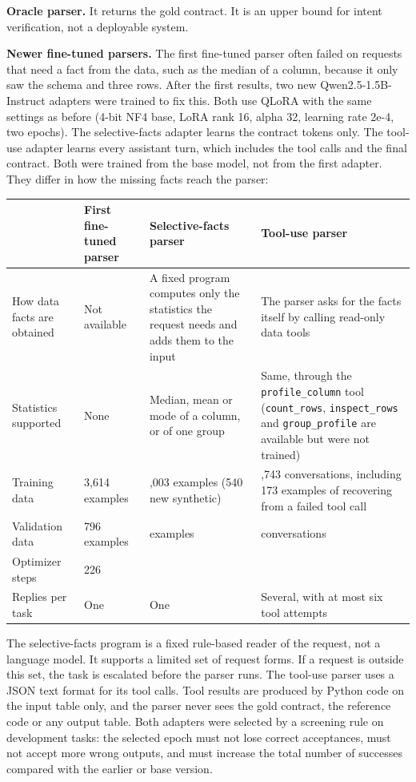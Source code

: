 \documentclass[11pt]{article}
\begin{document}
\textbf{Oracle parser.} It returns the gold contract. It is an upper
bound for intent verification, not a deployable system.

\textbf{Newer fine-tuned parsers.} The first fine-tuned parser often
failed on requests that need a fact from the data, such as the median of
a column, because it only saw the schema and three rows. After the first
results, two new Qwen2.5-1.5B-Instruct adapters were trained to fix
this. Both use QLoRA with the same settings as before (4-bit NF4 base,
LoRA rank 16, alpha 32, learning rate 2e-4, two epochs). The
selective-facts adapter learns the contract tokens only. The tool-use
adapter learns every assistant turn, which includes the tool calls and
the final contract. Both were trained from the base model, not from the
first adapter. They differ in how the missing facts reach the parser:

\begin{table}[!tp]
\centering\footnotesize\setlength{\tabcolsep}{3pt}\renewcommand{\arraystretch}{1.1}
\begin{tabularx}{\textwidth}{ll>{\raggedright\arraybackslash}X>{\raggedright\arraybackslash}X}
\toprule
\textbf{} & \textbf{First fine-tuned parser} & \textbf{Selective-facts parser} & \textbf{Tool-use parser} \\
\midrule
How data facts are obtained & Not available & A fixed program computes only the statistics the request needs and adds them to the input & The parser asks for the facts itself by calling read-only data tools \\
Statistics supported & None & Median, mean or mode of a column, or of one group & Same, through the \texttt{profile\_\allowbreak{}column} tool (\texttt{count\_\allowbreak{}rows}, \texttt{inspect\_\allowbreak{}rows} and \texttt{group\_\allowbreak{}profile} are available but were not trained) \\
Training data & 3,614 examples & 4,003 examples (540 new synthetic) & 4,743 conversations, including 173 examples of recovering from a failed tool call \\
Validation data & 796 examples & 902 examples & 914 conversations \\
Optimizer steps & 226 & 502 & 594 \\
Replies per task & One & One & Several, with at most six tool attempts \\
\bottomrule
\end{tabularx}
\end{table}

The selective-facts program is a fixed rule-based reader of the request,
not a language model. It supports a limited set of request forms. If a
request is outside this set, the task is escalated before the parser
runs. The tool-use parser uses a JSON text format for its tool calls.
Tool results are produced by Python code on the input table only, and
the parser never sees the gold contract, the reference code or any
output table. Both adapters were selected by a screening rule on
development tasks: the selected epoch must not lose correct acceptances,
must not accept more wrong outputs, and must increase the total number
of successes compared with the earlier or base version.
\end{document}
